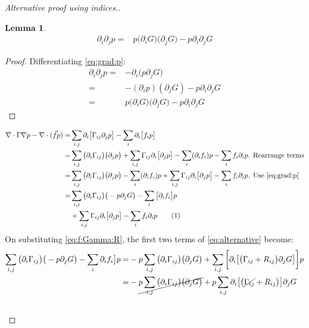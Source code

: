 \documentclass[]{article}
\newcommand\numberthis{\addtocounter{equation}{1}\tag{\theequation}}
\newtheorem{lemma}[thm]{Lemma}
\begin{document}
\begin{proof}[Alternative proof using indices.]
	\begin{lemma} \label{lemma:d2:p}
		\begin{align*}
			\partial_i \partial_j p 
			=&p \big(\partial_i G\big) \big(\partial_j G\big)  - p \partial_i \partial_j G
		\end{align*}
	\end{lemma}
	\begin{proof}
		Differentiating \eqref{eq:grad:p}:
		\begin{align*}
			\partial_i \partial_j p =& - \partial_i \big(p \partial_j G\big)\\
			=& -(\partial_i p) (\partial_j G) - p \partial_i \partial_j G\\
			=&p \big(\partial_i G\big) \big(\partial_j G\big)  - p \partial_i \partial_j G 
		\end{align*}
	\end{proof}
	\begin{align*}
		\nabla\cdot\Gamma\nabla p - \nabla \cdot (\vec{f} p) =& \sum_{i,j}\partial_i\big[\Gamma_{ij}\partial_j p\big] - \sum_{i} \partial_i \big[f_i p\big]\\
		=&\sum_{i,j}\big(\partial_i\Gamma_{ij}\big)\big(\partial_j p\big) + \sum_{i,j}\Gamma_{ij}\partial_i\big[\partial_j p\big]-\sum_{i} (\partial_i f_i)  p-  \sum_{i} f_i\partial_i  p  \text{. Rearrange terms}\\
		=&\sum_{i,j}\big(\partial_i\Gamma_{ij}\big)\big(\partial_j p\big) -\sum_{i} (\partial_i f_i)  p + \sum_{i,j}\Gamma_{ij}\partial_i\big[\partial_j p\big]-  \sum_{i} f_i\partial_i  p \text{. Use \eqref{eq:grad:p}}\\
		=&\sum_{i,j}\big(\partial_i\Gamma_{ij}\big)\big(-p \partial_j G\big) -\sum_{i} \big[\partial_i f_i\big]  p \\
		&+ \sum_{i,j}\Gamma_{ij}\partial_i\big[\partial_j p\big]-  \sum_{i} f_i\partial_i  p  \numberthis \label{eq:alternative}
	\end{align*} 
	On substituting \eqref{eq:f:Gamma:R}, the first two terms of \eqref{eq:alternative} become:
	\begin{align*}
		\sum_{i,j}\big(\partial_i\Gamma_{ij}\big)\big(-p \partial_j G\big) -\sum_{i} \partial_i f_i\big]  p=&-p \sum_{i,j} \big(\partial_i\Gamma_{ij}\big)\big(\partial_j G\big) +\sum_{i,j} \bigg[\partial_i \big[ \big(\Gamma_{ij} +R_{ij}\big)\partial_j G \big] \bigg]  p\\
		=&-\cancel{p \sum_{i,j} \big(\partial_i\Gamma_{ij}\big)\big(\partial_j G\big)} + p \sum_{i,j} \partial_i \big[ \big(\cancel{\Gamma_{ij}} +R_{ij}\big) \big]\partial_j G  \\&

\end{align*}
\end{proof}
\end{document}
